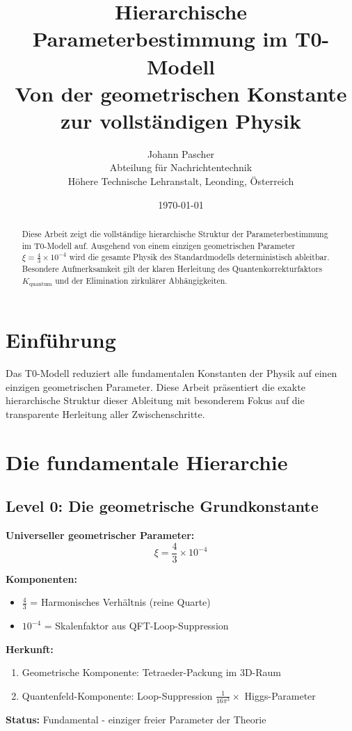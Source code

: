 \documentclass[12pt,a4paper]{article}
\title{Hierarchische Parameterbestimmung im T0-Modell \\
	\large Von der geometrischen Konstante zur vollständigen Physik}
\author{Johann Pascher\\
	Abteilung für Nachrichtentechnik\\
	Höhere Technische Lehranstalt, Leonding, Österreich}
\date{\today}
\newcommand{\xipar}{\xi}
\newcommand{\Kquantum}{K_{\text{quantum}}}
\begin{document}
	
	\maketitle
	
	\begin{abstract}
		Diese Arbeit zeigt die vollständige hierarchische Struktur der Parameterbestimmung im T0-Modell auf. Ausgehend von einem einzigen geometrischen Parameter $\xipar = \frac{4}{3} \times 10^{-4}$ wird die gesamte Physik des Standardmodells deterministisch ableitbar. Besondere Aufmerksamkeit gilt der klaren Herleitung des Quantenkorrekturfaktors $\Kquantum$ und der Elimination zirkulärer Abhängigkeiten.
	\end{abstract}
	
	\tableofcontents
	\newpage
	
	\section{Einführung}
	
	Das T0-Modell reduziert alle fundamentalen Konstanten der Physik auf einen einzigen geometrischen Parameter. Diese Arbeit präsentiert die exakte hierarchische Struktur dieser Ableitung mit besonderem Fokus auf die transparente Herleitung aller Zwischenschritte.
	
	\section{Die fundamentale Hierarchie}
	
	\subsection{Level 0: Die geometrische Grundkonstante}
	
	\begin{fundamental}
		\textbf{Universeller geometrischer Parameter:}
		\begin{equation}
			\boxed{\xipar = \frac{4}{3} \times 10^{-4}}
		\end{equation}
		
		\textbf{Komponenten:}
		\begin{itemize}
			\item $\frac{4}{3}$ = Harmonisches Verhältnis (reine Quarte)
			\item $10^{-4}$ = Skalenfaktor aus QFT-Loop-Suppression
		\end{itemize}
		
		\textbf{Herkunft:} 
		\begin{enumerate}
			\item Geometrische Komponente: Tetraeder-Packung im 3D-Raum
			\item Quantenfeld-Komponente: Loop-Suppression $\frac{1}{16\pi^3} \times$ Higgs-Parameter
		\end{enumerate}
		
		\textbf{Status:} Fundamental - einziger freier Parameter der Theorie
	\end{fundamental}
	
\end{document}
